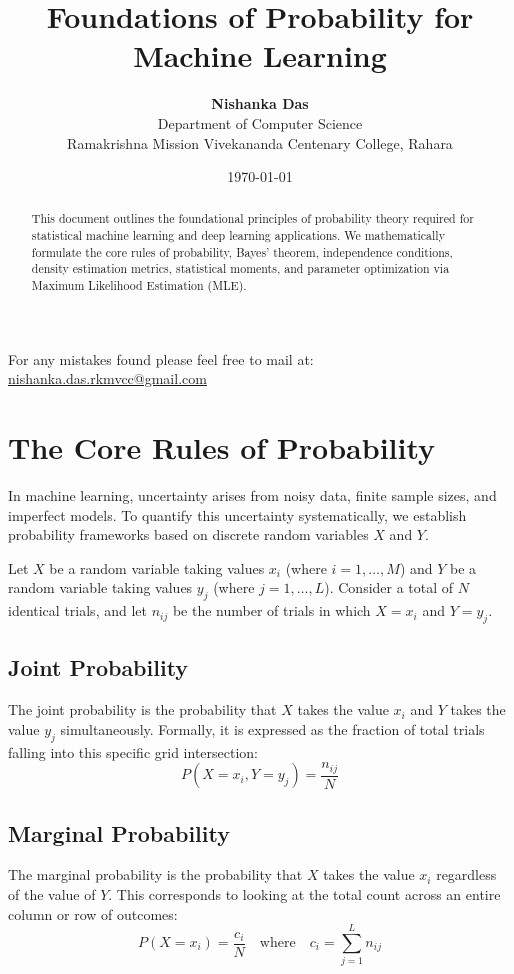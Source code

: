 \documentclass[11pt,a4paper]{article}
\title{\textbf{Foundations of Probability for Machine Learning}}
\author{\textbf{Nishanka Das} \\ 
Department of Computer Science \\ 
Ramakrishna Mission Vivekananda Centenary College, Rahara}
\date{\today}
\begin{document}
\maketitle

\begin{center}
For any mistakes found please feel free to mail at: \\
\url{nishanka.das.rkmvcc@gmail.com}
\end{center}

\begin{abstract}
This document outlines the foundational principles of probability theory required for statistical machine learning and deep learning applications. We mathematically formulate the core rules of probability, Bayes' theorem, independence conditions, density estimation metrics, statistical moments, and parameter optimization via Maximum Likelihood Estimation (MLE).
\end{abstract}

\section{The Core Rules of Probability}
In machine learning, uncertainty arises from noisy data, finite sample sizes, and imperfect models. To quantify this uncertainty systematically, we establish probability frameworks based on discrete random variables $X$ and $Y$. 

Let $X$ be a random variable taking values $x_i$ (where $i = 1, \dots, M$) and $Y$ be a random variable taking values $y_j$ (where $j = 1, \dots, L$). Consider a total of $N$ identical trials, and let $n_{ij}$ be the number of trials in which $X = x_i$ and $Y = y_j$.

\subsection{Joint Probability}
The joint probability is the probability that $X$ takes the value $x_i$ and $Y$ takes the value $y_j$ simultaneously. Formally, it is expressed as the fraction of total trials falling into this specific grid intersection:
\begin{equation}
P(X=x_i, Y=y_j) = \frac{n_{ij}}{N}
\end{equation}

\subsection{Marginal Probability}
The marginal probability is the probability that $X$ takes the value $x_i$ regardless of the value of $Y$. This corresponds to looking at the total count across an entire column or row of outcomes:
\begin{equation}
P(X=x_i) = \frac{c_i}{N} \quad \text{where} \quad c_i = \sum_{j=1}^{L} n_{ij}
\end{equation}
\end{document}
